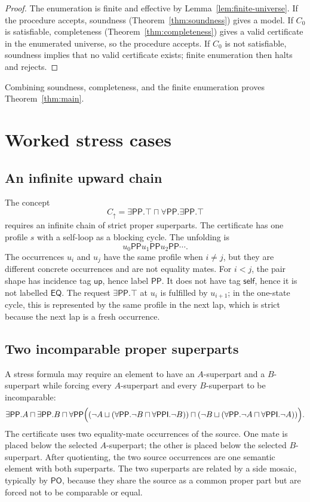 \documentclass[11pt]{article}
\newcommand{\EQ}{\mathsf{EQ}}
\newcommand{\PO}{\mathsf{PO}}
\newcommand{\PP}{\mathsf{PP}}
\newcommand{\PPI}{\mathsf{PPI}}
\newcommand{\up}{\mathsf{up}}
\newcommand{\self}{\mathsf{self}}
\begin{document}
\begin{proof}
The enumeration is finite and effective by Lemma~\ref{lem:finite-universe}.  If the procedure accepts, soundness (Theorem~\ref{thm:soundness}) gives a model.  If $C_0$ is satisfiable, completeness (Theorem~\ref{thm:completeness}) gives a valid certificate in the enumerated universe, so the procedure accepts.  If $C_0$ is not satisfiable, soundness implies that no valid certificate exists; finite enumeration then halts and rejects.
\end{proof}

Combining soundness, completeness, and the finite enumeration proves Theorem~\ref{thm:main}.

\section{Worked stress cases}

\subsection{An infinite upward chain}

The concept
\[
  C_\uparrow=\exists\PP.\top\sqcap\forall\PP.\exists\PP.\top
\]
requires an infinite chain of strict proper superparts.  The certificate has one profile $s$ with a self-loop as a blocking cycle.  The unfolding is
\[
  u_0\PP u_1\PP u_2\PP\cdots.
\]
The occurrences $u_i$ and $u_j$ have the same profile when $i\ne j$, but they are different concrete occurrences and are not equality mates.  For $i<j$, the pair shape has incidence tag $\up$, hence label $\PP$.  It does not have tag $\self$, hence it is not labelled $\EQ$.  The request $\exists\PP.\top$ at $u_i$ is fulfilled by $u_{i+1}$; in the one-state cycle, this is represented by the same profile in the next lap, which is strict because the next lap is a fresh occurrence.

\subsection{Two incomparable proper superparts}

A stress formula may require an element to have an $A$-superpart and a $B$-superpart while forcing every $A$-superpart and every $B$-superpart to be incomparable:
\[
\exists\PP.A\sqcap\exists\PP.B\sqcap
\forall\PP\Bigl((\neg A\sqcup(\forall\PP.\neg B\sqcap\forall\PPI.\neg B))
\sqcap
(\neg B\sqcup(\forall\PP.\neg A\sqcap\forall\PPI.\neg A))\Bigr).
\]
The certificate uses two equality-mate occurrences of the source.  One mate is placed below the selected $A$-superpart; the other is placed below the selected $B$-superpart.  After quotienting, the two source occurrences are one semantic element with both superparts.  The two superparts are related by a side mosaic, typically by $\PO$, because they share the source as a common proper part but are forced not to be comparable or equal.
\end{document}
